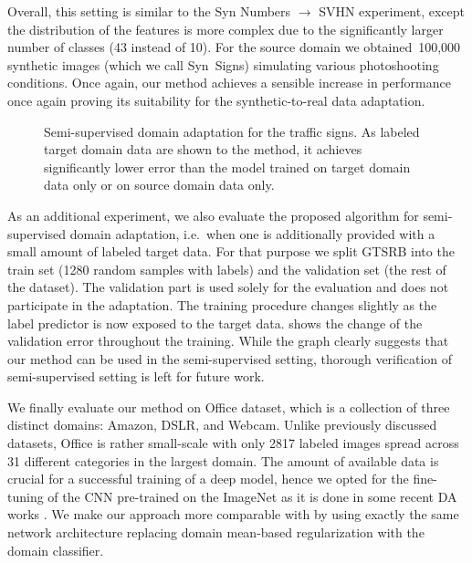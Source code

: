 \vspace{2mm}
Overall, this setting is similar to the {\sc Syn Numbers} $ \rightarrow $ {\sc SVHN} experiment, except the distribution of the features is more complex due to the significantly larger number of classes (43 instead of 10). For the source domain we obtained~100,000 synthetic images (which we call {\sc Syn~Signs}) simulating various photoshooting conditions. Once again, our method achieves a sensible increase in performance once again proving its suitability for the synthetic-to-real data adaptation.

\begin{figure}
  \centering
  \setlength\figureheight{2.7cm}
  \setlength\figurewidth{6.8cm}
  
  \caption{Semi-supervised domain adaptation for the traffic signs. As labeled target domain data are shown to the method, it achieves significantly lower error than the model trained on target domain data only or on source domain data only. \vspace{-4mm}}
  \label{fig:exper_semi_test}
\end{figure}

As an additional experiment, we also evaluate the proposed algorithm for semi-supervised domain adaptation, i.e.\ when one is additionally provided with a small amount of labeled target data. For that purpose we split {\sc GTSRB} into the train set (1280 random samples with labels) and the validation set (the rest of the dataset). The validation part is used solely for the evaluation and does not participate in the adaptation. The training procedure changes slightly as the label predictor is now exposed to the target data.  shows the change of the validation error throughout the training. While the graph clearly suggests that our method can be used in the semi-supervised setting, thorough verification of semi-supervised setting is left for future work.


\vspace{2mm} 
We finally evaluate our method on {\sc Office} dataset, which is a collection of three distinct domains: {\sc Amazon}, {\sc DSLR}, and {\sc Webcam}. Unlike previously discussed datasets, {\sc Office} is rather small-scale with only 2817 labeled images spread across 31 different categories in the largest domain. The amount of available data is crucial for a successful training of a deep model, hence we opted for the fine-tuning of the CNN pre-trained on the ImageNet \cite{Jia14} as it is done in some recent DA works \cite{Donahue14,Tzeng14,Hoffman14}. We make our approach more comparable with \cite{Tzeng14} by using exactly the same network architecture replacing domain mean-based regularization with the domain classifier.

